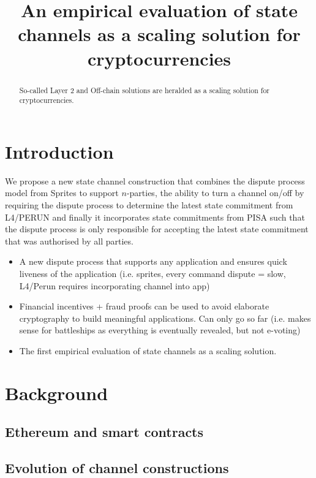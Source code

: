 \documentclass{article}
\begin{document}
	\title{An empirical evaluation of state channels as a scaling solution for cryptocurrencies}
	\maketitle
	\begin{abstract}
		So-called Layer 2 and Off-chain solutions are heralded as a scaling solution for cryptocurrencies. 
	\end{abstract} 

\section{Introduction}

We propose a new state channel construction that combines the dispute process model from Sprites to support $n$-parties, the ability to turn a channel on/off by requiring the dispute process to determine the latest state commitment from L4/PERUN and finally it incorporates state commitments from PISA such that the dispute process is only responsible for accepting the latest state commitment that was authorised by all parties. 


\begin{itemize}
\item A new dispute process that supports any application and ensures quick liveness of the application (i.e. sprites, every command dispute = slow, L4/Perun requires incorporating channel into app)
\item Financial incentives + fraud proofs can be used to avoid elaborate cryptography to build meaningful applications. Can only go so far (i.e. makes sense for battleships as everything is eventually revealed, but not e-voting) 
\item The first empirical evaluation of state channels as a scaling solution. 

\end{itemize}
\section{Background}

\subsection{Ethereum and smart contracts}
\subsection{Evolution of channel constructions}
\end{document}
